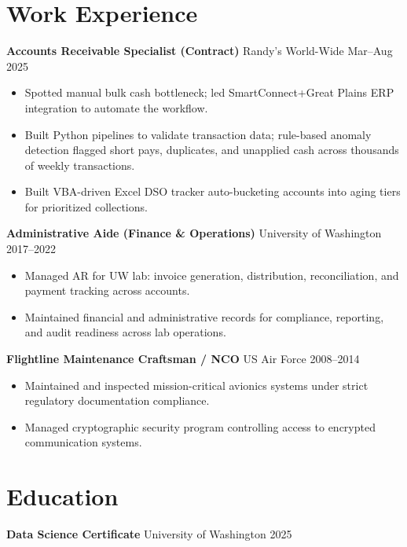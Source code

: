 \documentclass[11pt,a4paper]{article}
\begin{document}
\section*{Work Experience}

\noindent
\textbf{Accounts Receivable Specialist (Contract)} \hfill Randy's World-Wide \hfill Mar--Aug 2025
\begin{itemize}
    \item Spotted manual bulk cash bottleneck; led SmartConnect+Great Plains ERP integration to automate the workflow.
    \item Built Python pipelines to validate transaction data; rule-based anomaly detection flagged short pays, duplicates, and unapplied cash across thousands of weekly transactions.
    \item Built VBA-driven Excel DSO tracker auto-bucketing accounts into aging tiers for prioritized collections.
\end{itemize}

\vspace{0.2cm}
\noindent
\textbf{Administrative Aide (Finance \& Operations)} \hfill University of Washington \hfill 2017--2022
\begin{itemize}
    \item Managed AR for UW lab: invoice generation, distribution, reconciliation, and payment tracking across accounts.
    \item Maintained financial and administrative records for compliance, reporting, and audit readiness across lab operations.
\end{itemize}

\vspace{0.2cm}
\noindent
\textbf{Flightline Maintenance Craftsman / NCO} \hfill US Air Force \hfill 2008--2014
\begin{itemize}
    \item Maintained and inspected mission-critical avionics systems under strict regulatory documentation compliance.
    \item Managed cryptographic security program controlling access to encrypted communication systems.
\end{itemize}

\section*{Education}

\noindent
\textbf{Data Science Certificate} \hfill University of Washington \hfill 2025
\end{document}
